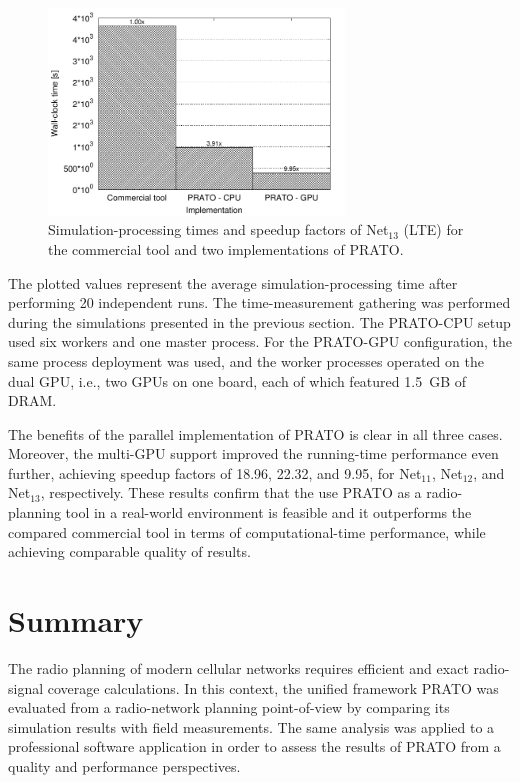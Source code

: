 \begin{figure}[h]
\centering

\includegraphics[width=0.7\textwidth]{08-real_network_planning/img/lte_running_times}

\caption{Simulation-processing times and speedup factors of Net$_{13}$ (LTE)
for the commercial tool and two implementations of PRATO. \label{fig:08-Running_times-LTE}}
\end{figure}


The plotted values represent the average simulation-processing time
after performing 20 independent runs. The time-measurement gathering
was performed during the simulations presented in the previous section.
The PRATO-CPU setup used six workers and one master process. For the
PRATO-GPU configuration, the same process deployment was used, and
the worker processes operated on the dual GPU, i.e., two GPUs on one
board, each of which featured 1.5~GB of DRAM. 

The benefits of the parallel implementation of PRATO is clear in all
three cases. Moreover, the multi-GPU support improved the running-time
performance even further, achieving speedup factors of 18.96, 22.32,
and 9.95, for Net$_{11}$, Net$_{12}$, and Net$_{13}$, respectively.
These results confirm that the use PRATO as a radio-planning tool
in a real-world environment is feasible and it outperforms the compared
commercial tool in terms of computational-time performance, while
achieving comparable quality of results.


\section{Summary}

The radio planning of modern cellular networks requires efficient
and exact radio-signal coverage calculations. In this context, the
unified framework PRATO was evaluated from a radio-network planning
point-of-view by comparing its simulation results with field measurements.
The same analysis was applied to a professional software application
in order to assess the results of PRATO from a quality and performance
perspectives.

